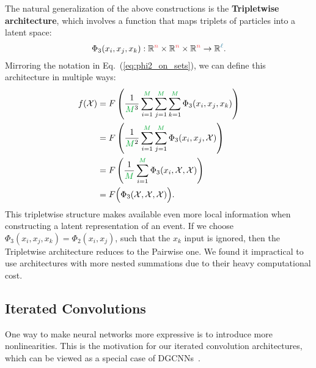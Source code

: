 \documentclass[aps,prd,twocolumn,superscriptaddress,floatfix,longbibliography,preprintnumbers,nofootinbib]{revtex4-1} %
\DeclareRobustCommand{\Eq}[1]{Eq.~(\ref{eq:#1})}
\begin{document}
         
         The natural generalization of the above constructions is the \textbf{Tripletwise architecture}, which involves a function that maps triplets of particles into a latent space:
          \begin{equation}
       \Phi_3(x_i,x_j,x_k):\mathbb R^{\color{c1}n}\times \mathbb R^{\color{c1}n} \times \mathbb R^{\color{c1}n} \rightarrow\mathbb R^{\color{c3}\ell}.
      \end{equation}
         Mirroring the notation in  \Eq{phi2_on_sets}, we can define this architecture in multiple ways:
         \begin{align}
        \nonumber
	f(\mathcal X) &= F \left( \frac{1}{{\color{c2}M}^3}\sum_{i=1}^{{\color{c2}M}}\sum_{j=1}^{{\color{c2}M}}\sum_{k=1}^{{\color{c2}M}} \Phi_3(x_i,x_j,x_k) \right)\\
        \nonumber &= F \left( \frac{1}{{\color{c2}M}^2}\sum_{i=1}^{{\color{c2}M}}\sum_{j=1}^{{\color{c2}M}} \Phi_3(x_i,x_j,\mathcal X) \right)\\
        \nonumber &= F \left( \frac{1}{{\color{c2}M}}\sum_{i=1}^{{\color{c2}M}}\Phi_3(x_i,\mathcal X,\mathcal X)\right)\\
        &= F \Big(\Phi_3(\mathcal X,\mathcal X,\mathcal X)\Big).
        \label{eq:triplesum}
      \end{align}
         This tripletwise structure makes available even more local information when constructing a latent representation of an event.
         If we choose $\Phi_3(x_i,x_j,x_k)=\Phi_2(x_i,x_j)$, such that the $x_k$ input is ignored, then the Tripletwise architecture reduces to the Pairwise one.
         We found it impractical to use architectures with more nested summations due to their heavy computational cost.

         
      
      \subsection{Iterated Convolutions}
      \label{sec:iterated}
      
      One way to make neural networks more expressive is to introduce more nonlinearities.
      This is the motivation for our iterated convolution architectures, which can be viewed as a special case of DGCNNs~\cite{Wang:2018nkf}.
      
\end{document}
